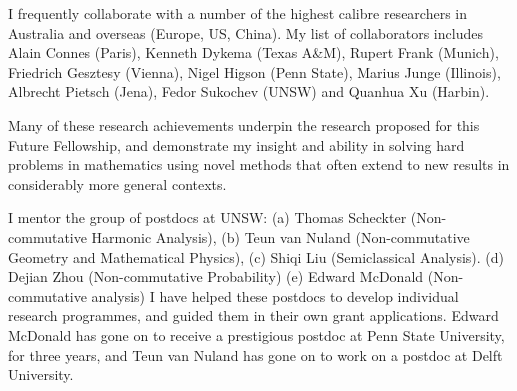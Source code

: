 \documentclass[12pt]{article}
\newcommand{\archeading}[1]{\vspace{.3cm} \noindent{\bfseries #1} \vspace{.1cm}   }
\begin{document}
I frequently collaborate with a number of the highest calibre researchers in Australia and overseas (Europe, US, China). My list of collaborators includes Alain Connes (Paris), Kenneth Dykema (Texas A\&M), Rupert Frank (Munich), Friedrich Gesztesy (Vienna), Nigel Higson (Penn State), Marius Junge (Illinois), Albrecht Pietsch (Jena), Fedor Sukochev (UNSW) and Quanhua Xu (Harbin). 


Many of these research achievements underpin the research proposed for this Future Fellowship, and demonstrate my insight and ability in solving hard problems in mathematics using novel methods that often extend to new results in considerably more general contexts.

\archeading{Leadership and mentoring} I mentor the group of postdocs at UNSW: (a) Thomas Scheckter (Non-commutative Harmonic Analysis), (b) Teun van Nuland (Non-commutative Geometry and Mathematical Physics), (c) Shiqi Liu (Semiclassical Analysis). (d) Dejian Zhou (Non-commutative Probability) (e) Edward McDonald (Non-commutative analysis)
I have helped these postdocs to develop individual research programmes, and guided them in their own grant applications.
Edward McDonald has gone on to receive a prestigious postdoc at Penn State University, for three years, and Teun van
Nuland has gone on to work on a postdoc at Delft University.
\end{document}
